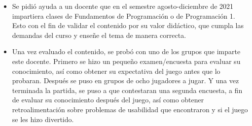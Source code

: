 \begin{itemize}
    \item Se pidió ayuda a un docente que en el semestre agosto-diciembre de 2021 impartiera clases de Fundamentos de Programación o de Programación 1. Esto con el fin de validar el contenido por su valor didáctico, que cumpla las demandas del curso y enseñe el tema de manera correcta.
    \item Una vez evaluado el contenido, se probó con uno de los grupos que imparte este docente. Primero se hizo un pequeño examen/encuesta para evaluar su conocimiento, así como obtener su expectativa del juego antes que lo probaran. Después se puso en grupos de ocho jugadores a jugar. Y una vez terminada la partida, se puso a que contestaran una segunda encuesta, a fin de evaluar su conocimiento después del juego, así como obtener retroalimentación sobre problemas de usabilidad que encontraron y si el juego se les hizo divertido.
\end{itemize}

